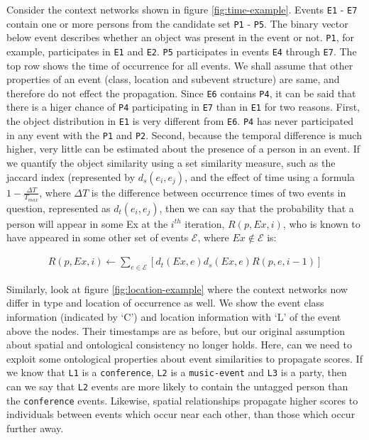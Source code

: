 Consider the context networks shown in figure \ref{fig:time-example}. Events \texttt{E1} - \texttt{E7} contain one or more persons from the candidate set \texttt{P1} - \texttt{P5}. The binary vector below event describes whether an object was present in the event or not. \texttt{P1}, for example, participates in \texttt{E1} and \texttt{E2}. \texttt{P5} participates in events \texttt{E4} through \texttt{E7}. The top row shows the time of occurrence for all events. We shall assume that other properties of an event (class, location and subevent structure) are same, and therefore do not effect the propagation. Since \texttt{E6} contains \texttt{P4}, it can be said that there is a higer chance of \texttt{P4} participating in \texttt{E7} than in \texttt{E1} for two reasons. First, the object distribution in \texttt{E1} is very different from \texttt{E6}. \texttt{P4} has never participated in any event with the \texttt{P1} and \texttt{P2}. Second, because the temporal difference is much higher, very little can be estimated about the presence of a person in an event. If we quantify the object similarity using a set similarity measure, such as the jaccard index (represented by $d_s(e_i, e_j)$, and the effect of time using a formula $1 - \frac{\Delta T}{T_{max}}$, where $\Delta T$ is the difference between occurrence times of two events in question, represented as $d_t(e_i, e_j)$, then we can say that the probability that a person will appear in some Ex at the $i^{th}$ iteration, $R(p, Ex, i)$, who is known to have appeared in some other set of events $\mathcal{E}$, where $Ex \notin \mathcal{E}$ is:

\begin{align}
\label{eq:puirank}
R(p, Ex, i) \leftarrow \sum_{e \in \mathcal{E}}[ d_t (Ex, e) d_s (Ex, e) R(p, e, i-1) ]
\end{align}

Similarly, look at figure \ref{fig:location-example} where the context networks now differ in type and location of occurrence as well. We show the event class information (indicated by `C') and location information with `L' of the event above the nodes. Their timestamps are as before, but our original assumption about spatial and ontological consistency no longer holds. Here, can we need to exploit some ontological properties about event similarities to propagate scores. If we know that \texttt{L1} is a \texttt{conference}, \texttt{L2} is a \texttt{music-event} and \texttt{L3} is a party, then can we say that \texttt{L2} events are more likely to contain the untagged person than the \texttt{conference} events. Likewise, spatial relationships propagate higher scores to individuals between events which occur near each other, than those which occur further away.


